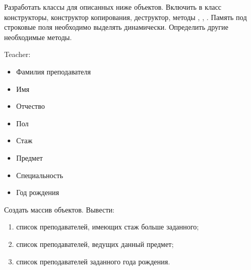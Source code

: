 
Разработать классы для описанных ниже объектов. Включить в класс
конструкторы, конструктор копирования, деструктор, методы ,
, . Память под строковые поля необходимо выделять
динамически. Определить другие необходимые методы.

Teacher:
\begin{itemize}
	\item Фамилия преподавателя
	\item Имя
	\item Отчество
	\item Пол
	\item Стаж
	\item Предмет
	\item Специальность
	\item Год рождения
\end{itemize}

Создать массив объектов. Вывести:
\begin{enumerate}
	\item список преподавателей, имеющих стаж больше заданного;
	\item список преподавателей, ведущих данный предмет;
	\item список преподавателей заданного года рождения.
\end{enumerate}
